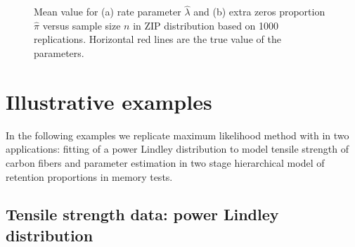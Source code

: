 \documentclass[nojss]{jss}
\begin{document}
\begin{figure}[H]
\begin{subfigure}[h]{0.49\textwidth}
        \caption{\label{fig:ZIPb}}
    \end{subfigure}
\caption{\label{fig:ZIP} Mean value for (a) rate parameter $\hat{\lambda}$ and (b) extra zeros proportion $\hat{\pi}$ versus sample size $n$ in ZIP distribution based on 1000 replications. Horizontal red lines are the true value of the parameters.}
\end{figure}



\section{Illustrative examples} \label{sec:illustrations}

In the following examples we replicate maximum likelihood method with  in two applications: fitting of a power Lindley distribution to model tensile strength of carbon fibers and parameter estimation in two stage hierarchical model of retention proportions in memory tests.

\subsection{Tensile strength data: power Lindley distribution}
\end{document}
